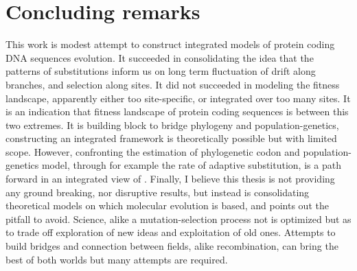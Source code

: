 \section{Concluding remarks}
\label{sec:concluding-remarks}

This work is modest attempt to construct integrated models of protein coding \acrshort{DNA} sequences evolution.
It succeeded in consolidating the idea that the patterns of \glspl{substitution} inform us on long term fluctuation of drift along branches, and selection along sites.
It did not succeeded in modeling the fitness landscape, apparently either too site-specific, or integrated over too many sites.
It is an indication that fitness landscape of protein coding sequences is between this two extremes.
It is building block to bridge phylogeny and population-genetics, constructing an integrated framework is theoretically possible but with limited scope.
However, confronting the estimation of phylogenetic \gls{codon} and population-genetics model, through for example the rate of adaptive \gls{substitution}, is a path forward in an integrated view of .
Finally, I believe this thesis is not providing any ground breaking, nor disruptive results, but instead is consolidating theoretical models on which molecular evolution is based, and points out the pitfall to avoid.
Science, alike a mutation-selection process not is optimized but as to trade off exploration of new ideas and exploitation of old ones.
Attempts to build bridges and connection between fields, alike \gls{recombination}, can bring the best of both worlds but many attempts are required.